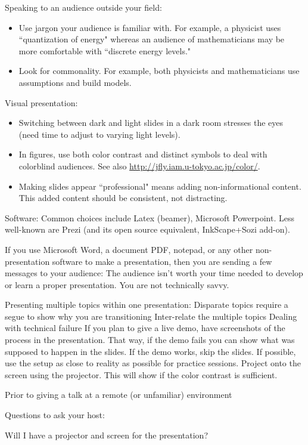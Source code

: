 Speaking to an audience outside your field:
\begin{itemize}
    \item Use jargon your audience is familiar with. For example, a physicist uses ``quantization of energy" whereas an audience of mathematicians may be more comfortable with ``discrete energy levels."
    \item Look for commonality. For example, both physicists and mathematicians use assumptions and build models.
\end{itemize}
Visual presentation:
\begin{itemize}
    \item Switching between dark and light slides in a dark room stresses the eyes (need time to adjust to varying light levels).
    \item In figures, use both color contrast and distinct symbols to deal with colorblind audiences. See also \href{http://jfly.iam.u-tokyo.ac.jp/color/}{http://jfly.iam.u-tokyo.ac.jp/color/}.
    \item Making slides appear ``professional" means adding non-informational content. This added content should be consistent, not distracting.
\end{itemize}
Software:
Common choices include Latex (beamer), Microsoft Powerpoint. Less well-known are Prezi (and its open source equivalent, InkScape+Sozi add-on).

If you use Microsoft Word, a document PDF, notepad, or any other non-presentation software to make a presentation, then you are sending a few messages to your audience:
The audience isn't worth your time needed to develop or learn a proper presentation. 
You are not technically savvy.

Presenting multiple topics within one presentation:
Disparate topics require a segue to show why you are transitioning
Inter-relate the multiple topics 
Dealing with technical failure
If you plan to give a live demo, have screenshots of the process in the presentation. That way, if the demo fails you can show what was supposed to happen in the slides. If the demo works, skip the slides.
If possible, use the setup as close to reality as possible for practice sessions. Project onto the screen using the projector. This will show if the color contrast is sufficient.

Prior to giving a talk at a remote (or unfamiliar) environment

Questions to ask your host:

Will I have a projector and screen for the presentation?

